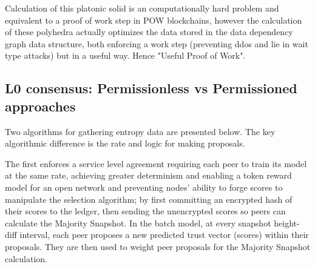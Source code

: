 \documentclass{article}
\begin{document}
Calculation of this platonic solid is an computationally hard problem and equivalent to a proof of work step in POW blockchains, however the calculation of these polyhedra actually optimizes the data stored in the data dependency graph data structure, both enforcing a work step (preventing ddos and lie in wait type attacks) but in a useful way. Hence "Useful Proof of Work".



\subsection {L0 consensus: Permissionless vs Permissioned approaches}
Two algorithms for gathering entropy data are presented below. The key algorithmic difference is the rate and logic for making proposals. 

The first enforces a service level agreement requiring each peer to train its model at the same rate, achieving greater determinism and enabling a token reward model for an open network and preventing nodes' ability to forge scores to manipulate the selection algorithm; by first committing an encrypted hash of their scores to the ledger, then sending the unencrypted scores so peers can calculate the Majority Snapshot. In the batch model, at every snapshot height-diff interval, each peer proposes a new predicted trust vector (scores) within their proposals. They are then used to weight peer proposals for the Majority Snapshot calculation.
\end{document}
